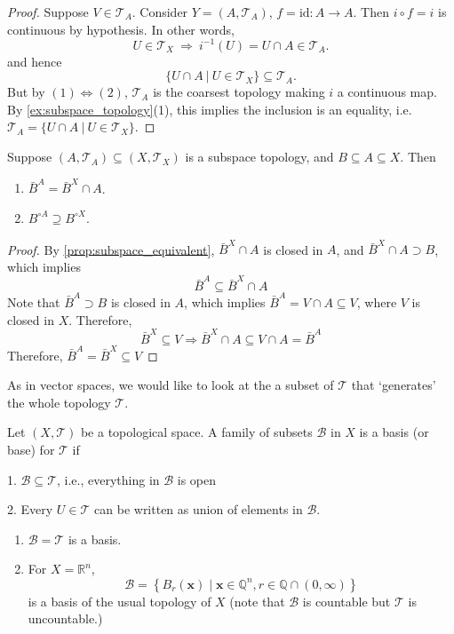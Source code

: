 \begin{example}
\begin{proof}
Suppose \(V \in \mathcal{T}_A\). Consider \(Y = (A, \mathcal{T}_A)\), \(f = \mathrm{id}: A \to A\). Then \(i \circ f = i\) is continuous by hypothesis. In other words,
$$U \in \mathcal{T}_X \ \Rightarrow\ i^{-1}(U) = U \cap A \in \mathcal{T}_A.$$
and hence 
$$\{U \cap A\ |\ U \in \mathcal{T}_X\} \subseteq \mathcal{T}_A.$$
But by $(1) \Leftrightarrow (2)$, $\mathcal{T}_A$ is the coarsest topology making $i$ a continuous map. By \autoref{ex:subspace_topology}(1), this implies the inclusion is an equality, i.e. $\mathcal{T}_A = \{ U \cap A\ |\ U \in \mathcal{T}_X\}$.
\end{proof}

\begin{proposition} 
Suppose \(\left({A,{\mathcal{T}}_{A}}\right)  \subseteq  \left({X,{\mathcal{T}}_X}\right)\) is a subspace topology, and \(B \subseteq  A \subseteq  X\). Then
\begin{enumerate}
 \item \({\bar{B}}^{A} = {\bar{B}}^X \cap  A\).
\item \({B}^{\circ A} \supseteq  {B}^{\circ X}\).
\end{enumerate}
\end{proposition}
\begin{proof} By \autoref{prop:subspace_equivalent}, \({\bar{B}}^X \cap  A\) is closed in \(A\), and \({\bar{B}}^X \cap  A \supset  B\), which implies
\[
{\bar{B}}^{A} \subseteq  {\bar{B}}^X\cap A
\]
Note that \({\bar{B}}^{A} \supset  B\) is closed in \(A\), which implies \({\bar{B}}^{A} = V \cap  A \subseteq  V\), where \(V\) is closed in \(X\). Therefore,
\[
{\bar{B}}^X \subseteq  V \Rightarrow  {\bar{B}}^X \cap  A \subseteq  V \cap  A = {\bar{B}}^{A}
\]
Therefore, \({\bar{B}}^{A} = {\bar{B}}^X \subseteq  V\)
\end{proof}

As in vector spaces, we would like to look at the a subset of $\mathcal{T}$ that `generates' the whole topology $\mathcal{T}$.
\begin{definition}[Basis] \label{def:base}
Let $(X, \mathcal{T})$ be a topological space. A family of subsets \(\mathcal{B}\) in \(X\) is a basis (or base) for \(\mathcal{T}\) if

1. \(\mathcal{B} \subseteq  \mathcal{T}\), i.e., everything in \(\mathcal{B}\) is open

2. Every \(U \in  \mathcal{T}\) can be written as union of elements in \(\mathcal{B}\).
\end{definition}


\begin{example} 
\begin{enumerate}
    \item \(\mathcal{B} = \mathcal{T}\) is a basis.
\item For \(X = {\mathbb{R}}^{n}\),
\[
\mathcal{B} = \left\{  {{B}_{r}\left(\mathbf{x}\right)  \mid  \mathbf{x} \in  {\mathbb{Q}}^{n},r \in  \mathbb{Q}\cap \left({0,\infty}\right)}\right\}
\]
is a basis of the usual topology of $X$ (note that \(\mathcal{B}\) is countable but $\mathcal{T}$ is uncountable.)
\end{enumerate}
\end{example}



\end{example}
